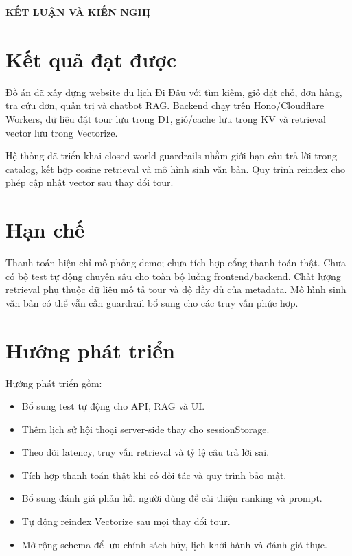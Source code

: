 \begin{center}
\large\textbf{KẾT LUẬN VÀ KIẾN NGHỊ}
\end{center}

\section*{Kết quả đạt được}
Đồ án đã xây dựng website du lịch Đi Đâu với tìm kiếm, giỏ đặt chỗ, đơn hàng, tra cứu đơn, quản trị và chatbot RAG. Backend chạy trên Hono/Cloudflare Workers, dữ liệu đặt tour lưu trong D1, giỏ/cache lưu trong KV và retrieval vector lưu trong Vectorize.

Hệ thống đã triển khai closed-world guardrails nhằm giới hạn câu trả lời trong catalog, kết hợp cosine retrieval và mô hình sinh văn bản. Quy trình reindex cho phép cập nhật vector sau thay đổi tour.

\section*{Hạn chế}
Thanh toán hiện chỉ mô phỏng demo; chưa tích hợp cổng thanh toán thật. Chưa có bộ test tự động chuyên sâu cho toàn bộ luồng frontend/backend. Chất lượng retrieval phụ thuộc dữ liệu mô tả tour và độ đầy đủ của metadata. Mô hình sinh văn bản có thể vẫn cần guardrail bổ sung cho các truy vấn phức hợp.

\section*{Hướng phát triển}
Hướng phát triển gồm:
\begin{itemize}
    \item Bổ sung test tự động cho API, RAG và UI.
    \item Thêm lịch sử hội thoại server-side thay cho sessionStorage.
    \item Theo dõi latency, truy vấn retrieval và tỷ lệ câu trả lời sai.
    \item Tích hợp thanh toán thật khi có đối tác và quy trình bảo mật.
    \item Bổ sung đánh giá phản hồi người dùng để cải thiện ranking và prompt.
    \item Tự động reindex Vectorize sau mọi thay đổi tour.
    \item Mở rộng schema để lưu chính sách hủy, lịch khởi hành và đánh giá thực.
\end{itemize}
